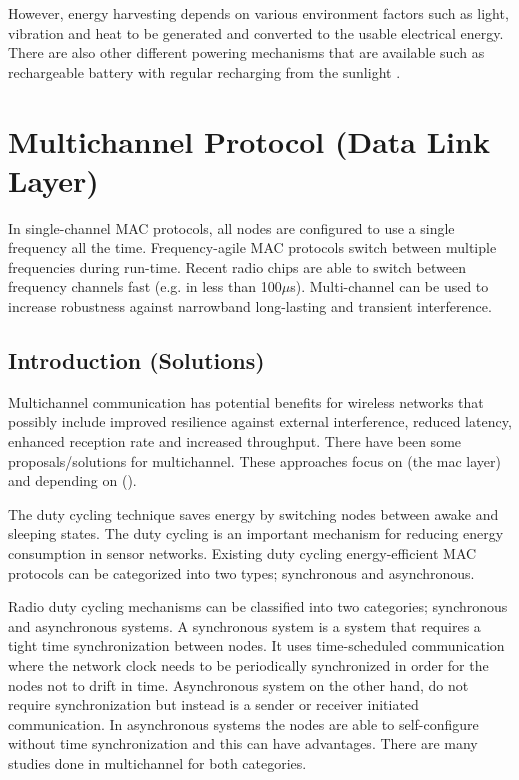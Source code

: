 However, energy harvesting depends on various environment factors such as light, vibration and heat to be generated and converted to the usable electrical energy. There are also other different powering mechanisms that are available such as rechargeable battery with regular recharging from the sunlight \cite{macsurvey}. 

\section{Multichannel Protocol (Data Link Layer)}
In single-channel MAC protocols, all nodes are configured to use a single frequency all the time. Frequency-agile MAC protocols switch between multiple frequencies during run-time. Recent radio chips are able to switch between frequency channels fast (e.g. in less than 100$\mu$s). Multi-channel can be used to increase robustness against narrowband long-lasting and transient interference. \cite{macsurvey}


\subsection{Introduction (Solutions)}
Multichannel communication has potential benefits for wireless networks that possibly include improved resilience against external interference, reduced latency, enhanced reception rate and increased throughput. 
There have been some proposals/solutions for multichannel. These approaches focus on (the mac layer) and depending on ().

The duty cycling technique saves energy by switching nodes between awake and sleeping states. The duty cycling is an important mechanism for reducing energy consumption in sensor networks. Existing duty cycling energy-efficient MAC protocols can be categorized into two types; synchronous and asynchronous.

Radio duty cycling mechanisms can be classified into two categories; synchronous and asynchronous systems. A synchronous system is a system that requires a tight time synchronization between nodes. It uses time-scheduled communication where the network clock needs to be periodically synchronized in order for the nodes not to drift in time. Asynchronous system on the other hand, do not require synchronization but instead is a sender or receiver initiated communication. In asynchronous systems the nodes are able to self-configure without time synchronization and this can have advantages. There are many studies done in multichannel for both categories.

